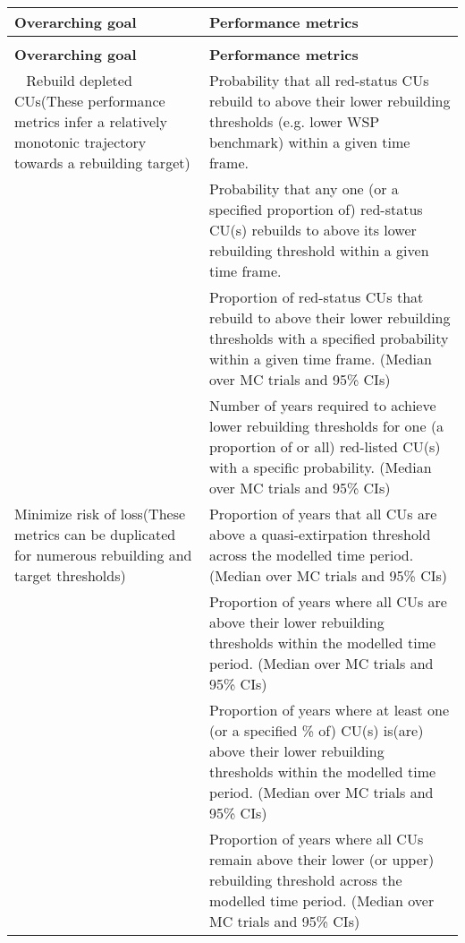 \documentclass[12pt]{article}\usepackage[]{graphicx}\usepackage[]{color}
\begin{document}
\begingroup\fontsize{11}{13}\selectfont
\begingroup\fontsize{11}{13}\selectfont
\begin{longtable}[t]{>{\raggedright\arraybackslash}p{15em}>{\raggedright\arraybackslash}p{30em}}
\caption{\label{tab:multi-row-table}Goals and performance metrics}\\
\toprule
\textbf{Overarching goal} & \textbf{Performance metrics}\\
\midrule
\endfirsthead
\caption*{}\\
\toprule
\textbf{Overarching goal} & \textbf{Performance metrics}\\
\midrule
\endhead
\
\endfoot
\bottomrule
\endlastfoot
Rebuild depleted CUs\newline (These performance metrics infer a relatively monotonic trajectory towards a rebuilding target) & Probability that all red-status CUs rebuild to above their lower rebuilding thresholds (e.g. lower WSP benchmark) within a given time frame.\\
\cmidrule(l){2-2}
 & Probability that any one (or a specified proportion of) red-status CU(s) rebuilds to above its lower rebuilding threshold within a given time frame.\\
\cmidrule(l){2-2}
 & Proportion of red-status CUs that rebuild to above their lower rebuilding thresholds with a specified probability within a given time frame. (Median over MC trials and 95\% CIs)\\
\cmidrule(l){2-2}
 & Number of years required to achieve lower rebuilding thresholds for one (a proportion of or all) red-listed CU(s) with a specific probability. (Median over MC trials and 95\% CIs)\\
\hline
Minimize risk of loss\newline (These metrics can be duplicated for numerous rebuilding and target thresholds) & Proportion of years that all CUs are above a quasi-extirpation threshold across the modelled time period. (Median over MC trials and 95\% CIs)\\
\cmidrule(l){2-2}
 & Proportion of years where all CUs are above their lower rebuilding thresholds within the modelled time period. (Median over MC trials and 95\% CIs)\\
\cmidrule(l){2-2}
 & Proportion of years where at least one (or a specified \% of) CU(s) is(are) above their lower rebuilding thresholds within the modelled time period. (Median over MC trials and 95\% CIs)\\
\cmidrule(l){2-2}
 & Proportion of years where all CUs remain above their lower (or upper) rebuilding threshold across the modelled time period. (Median over MC trials and 95\% CIs)\\

\end{longtable}
\end{document}
